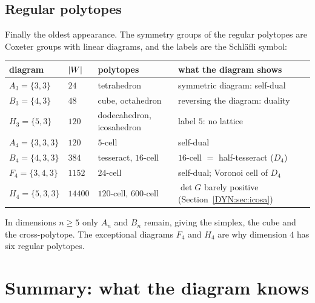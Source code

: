\subsection*{Regular polytopes}
Finally the oldest appearance. The symmetry groups of the regular polytopes are Coxeter groups with
linear diagrams, and the labels are the Schl\"afli symbol:
\begin{center}
\renewcommand{\arraystretch}{1.15}
\begin{tabular}{llll}
\toprule
diagram & $\left\lvert W \right\rvert$ & polytopes & what the diagram shows\\
\midrule
$A_3=\{3,3\}$ & $24$ & tetrahedron & symmetric diagram: self-dual\\
$B_3=\{4,3\}$ & $48$ & cube, octahedron & reversing the diagram: duality\\
$H_3=\{5,3\}$ & $120$ & dodecahedron, icosahedron & label $5$: no lattice\\
$A_4=\{3,3,3\}$ & $120$ & $5$-cell & self-dual\\
$B_4=\{4,3,3\}$ & $384$ & tesseract, $16$-cell & $16$-cell $=$ half-tesseract ($D_4$)\\
$F_4=\{3,4,3\}$ & $1152$ & $24$-cell & self-dual; Voronoi cell of $D_4$\\
$H_4=\{5,3,3\}$ & $14400$ & $120$-cell, $600$-cell & $\det G$ barely positive (Section~\ref{DYN:sec:icosa})\\
\bottomrule
\end{tabular}
\end{center}
In dimensions $n\ge5$ only $A_n$ and $B_n$ remain, giving the simplex, the cube and the cross-polytope.
The exceptional diagrams $F_4$ and $H_4$ are why dimension $4$ has six regular polytopes.

\section{Summary: what the diagram knows}
\label{DYN:sec:summary}


